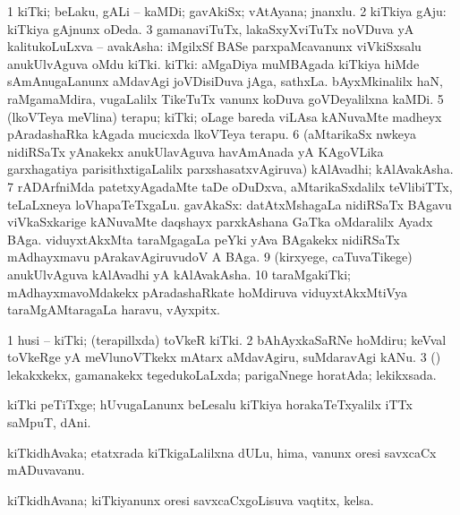 {{{{{{\bentry
{} 
\gl{\nA}
\expl{}
\bmng
\bnum
\num{1} kiTki; beLaku, gALi -- kaMDi; gavAkiSx; vAtAyana; jnanxlu. 
\num{2} kiTkiya gAju:  kiTkiya gAjnunx oDeda. 
\num{3} gamanaviTuTx, lakaSxyXviTuTx noVDuva yA kalitukoLuLxva -- avakAsha:  iMgilxSf BASe parxpaMcavanunx viVkiSxsalu anukUlvAguva oMdu kiTki. 
 kiTki: 
\banum
{} aMgaDiya muMBAgada kiTkiya hiMde sAmAnugaLanunx aMdavAgi joVDisiDuva jAga, sathxLa. 
 bAyxMkinalilx haN, raMgamaMdira, \mo vugaLalilx TikeTuTx \mo vanunx koDuva goVDeyalilxna kaMDi. 
\eanum
\numie
\num{5} (lkoVTeya meVlina) terapu; kiTki; oLage bareda viLAsa kANuvaMte madheyx pAradashaRka kAgada mucicxda lkoVTeya terapu. 
\num{6} (aMtarikaSx nwkeya nidiRSaTx yAnakekx anukUlavAguva havAmAnada yA KAgoVLika garxhagatiya parisithxtigaLalilx parxshasatxvAgiruva) kAlAvadhi; kAlAvakAsha. 
\num{7} rADArfniMda patetxyAgadaMte taDe oDuDxva, aMtarikaSxdalilx teVlibiTTx, teLaLxneya loVhapaTeTxgaLu. 
 gavAkaSx: 
\banum
{} datAtxMshagaLa nidiRSaTx BAgavu viVkaSxkarige kANuvaMte daqshayx parxkAshana GaTka  oMdaralilx Ayadx BAga. 
 viduyxtAkxMta taraMgagaLa peYki yAva BAgakekx nidiRSaTx mAdhayxmavu pArakavAgiruvudoV A BAga. 
\eanum
\numie
\num{9} (kirxyege, caTuvaTikege) anukUlvAguva kAlAvadhi yA kAlAvakAsha. 
\num{10} taraMgakiTki; mAdhayxmavoMdakekx pAradashaRkate hoMdiruva viduyxtAkxMtiVya taraMgAMtaragaLa haravu, vAyxpitx. 
\enum
\emng

\noindent
\gl{\pagu}
\expl{}
\bmng
\bnum
\num{1}  husi -- kiTki; (terapillxda) toVkeR kiTki. 
\num{2}  bAhAyxkaSaRNe hoMdiru; keVval toVkeRge yA meVlunoVTkekx mAtarx aMdavAgiru, suMdaravAgi kANu. 
\num{3}  (\AmA) lekakxkekx, gamanakekx tegedukoLaLxda; parigaNnege horatAda; lekikxsada. 
\enum
\emng
\eentry

\bentry
{}
  \gl{\nA}\bmng
kiTki peTiTxge; hUvugaLanunx beLesalu kiTkiya horakaTeTxyalilx iTTx saMpuT, dAni. 
\emng
\eentry

\bentry
{}
  \gl{\nA}\bmng
kiTkidhAvaka; etatxrada kiTkigaLalilxna dULu, hima, \mo vanunx oresi savxcaCx mADuvavanu. 
\emng
\eentry

\bentry
{}
  \gl{\nA}\bmng
kiTkidhAvana; kiTkiyanunx oresi savxcaCxgoLisuva vaqtitx, kelsa. 
\emng
\eentry

}}}}}}

